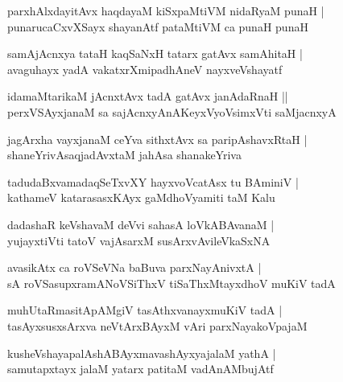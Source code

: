 \documentclass[twoside,12pt,openright]{book}
\newcounter{shloka}[chapter]
\begin{document}
\begin{shloka}%
parxhAlxdayitAvx haqdayaM kiSxpaMtiVM nidaRyaM punaH |\\
punarucaCxvXSayx shayanAtf pataMtiVM ca punaH punaH 
\end{shloka}

\begin{shloka}%
samAjAcnxya tataH kaqSaNxH tatarx gatAvx samAhitaH |\\
avaguhayx yadA vakatxrXmipadhAneV nayxveVshayatf 
\end{shloka}

\begin{shloka}%
idamaMtarikaM jAcnxtAvx tadA gatAvx janAdaRnaH ||\\
perxVSAyxjanaM sa sajAcnxyAnAKeyxVyoVsimxVti saMjacnxyA 
\end{shloka}

\begin{shloka}%
jagArxha vayxjanaM ceYva sithxtAvx sa paripAshavxRtaH |\\
shaneYrivAsaqjadAvxtaM jahAsa shanakeYriva 
\end{shloka}

\begin{shloka}%
tadudaBxvamadaqSeTxvXY hayxvoVcatAsx tu BAminiV |\\
kathameV katarasasxKAyx gaMdhoVyamiti taM Kalu
\end{shloka}

\begin{shloka}%
dadashaR keVshavaM deVvi sahasA loVkABAvanaM |\\
yujayxtiVti tatoV vajAsarxM susArxvAvileVkaSxNA 
\end{shloka}

\begin{shloka}%
avasikAtx ca roVSeVNa baBuva parxNayAnivxtA |\\
sA roVSasupxramANoVSiThxV tiSaThxMtayxdhoV muKiV tadA 
\end{shloka}

\begin{shloka}%
muhUtaRmasitApAMgiV tasAthxvanayxmuKiV tadA |\\
tasAyxsusxsArxva neVtArxBAyxM vAri parxNayakoVpajaM 
\end{shloka}

\begin{shloka}%
kusheVshayapalAshABAyxmavashAyxyajalaM yathA |\\
samutapxtayx jalaM yatarx patitaM vadAnAMbujAtf 
\end{shloka}
\end{document}
